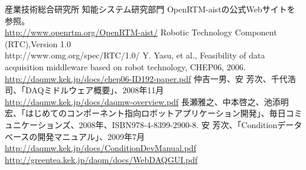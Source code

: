 \documentclass[a4j,10pt,dvips,onecolumn,oneside,final]{jarticle}%
\begin{document}
\begin{thebibliography}{99}

   産業技術総合研究所 知能システム研究部門 OpenRTM-aistの公式Webサイトを参照。\\
   \url{http://www.openrtm.org/OpenRTM-aist/}
  Robotic Technology Component (RTC),Version 1.0\\
   http://www.omg.org/spec/RTC/1.0/
  Y. Yasu, et al., Feasibility of data acquisition middleware based on robot technology, CHEP06, 2006.\\
   \url{http://daqmw.kek.jp/docs/chep06-ID192-paper.pdf}
  仲吉一男、安 芳次、千代浩司、「DAQミドルウェア概要」、2008年11月\\
   \url{http://daqmw.kek.jp/docs/daqmw-overview.pdf}
  長瀬雅之、中本啓之、池添明宏、「はじめてのコンポーネント指向ロボットアプリケーション開発」、毎日コミュニケーションズ、2008年、ISBN978-4-8399-2900-8.
 安 芳次、「Conditionデータベースの開発マニュアル」、2009年7月\\
\url{http://daqmw.kek.jp/docs/ConditionDevManual.pdf}
\url{http://greentea.kek.jp/daqm/docs/WebDAQGUI.pdf}
\end{thebibliography}


\newpage
\appendix
\end{document}
